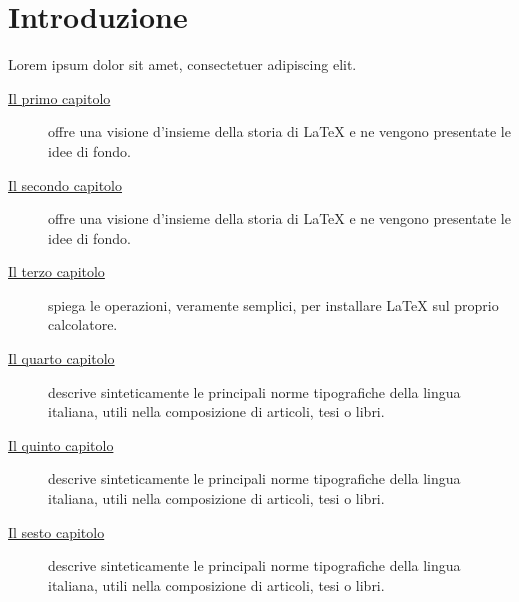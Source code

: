 
\cleardoublepage
{}
\chapter*{Introduzione}\label{cap:intro}


\lipsum[1]

Lorem ipsum dolor sit amet, consectetuer adipiscing elit.

\begin{description}
\item[{\hyperref[cap:intro]{Il primo capitolo}}]
offre una visione d'insieme della storia di \LaTeX{} e ne vengono presentate le idee di fondo.
\item[{\hyperref[cap:ctbn]{Il secondo capitolo}}]
offre una visione d'insieme della storia di \LaTeX{} e ne vengono presentate le idee di fondo.
\item[{\hyperref[cap:ctbnc]{Il terzo capitolo}}]
spiega le operazioni, veramente semplici, per installare \LaTeX{} sul proprio calcolatore.
\item[{\hyperref[cap:r]{Il quarto capitolo}}]
descrive sinteticamente le principali norme tipografiche della lingua italiana, utili nella composizione di articoli, tesi o libri.
\item[{\hyperref[cap:esperimenti]{Il quinto capitolo}}]
descrive sinteticamente le principali norme tipografiche della lingua italiana, utili nella composizione di articoli, tesi o libri.
\item[{\hyperref[cap:concl]{Il sesto capitolo}}]
descrive sinteticamente le principali norme tipografiche della lingua italiana, utili nella composizione di articoli, tesi o libri.
\end{description}

